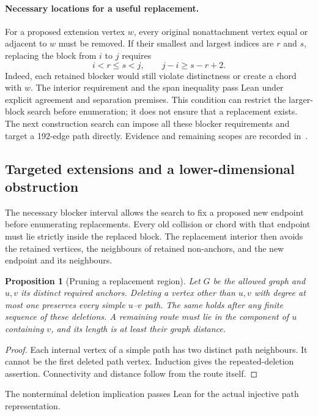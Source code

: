 \documentclass[11pt,a4paper]{article}
\newtheorem{proposition}[theorem]{Proposition}
\theoremstyle{definition}
\theoremstyle{remark}
\begin{document}
\paragraph{Necessary locations for a useful replacement.}
For a proposed extension vertex $w$, every original nonattachment
vertex equal or adjacent to $w$ must be removed. If their smallest
and largest indices are $r$ and $s$, replacing the block from $i$ to
$j$ requires
\[
i<r\le s<j,\qquad j-i\ge s-r+2.
\]
Indeed, each retained blocker would still violate distinctness or
create a chord with $w$. The interior requirement and the span
inequality pass Lean under explicit agreement and separation premises.
This condition can restrict the larger-block search before enumeration;
it does not ensure that a replacement exists. The next construction
search can impose all these blocker requirements and target a
192-edge path directly. Evidence and remaining scopes are recorded
in~\cite{block193archive}.


\subsection{Targeted extensions and a lower-dimensional obstruction}
\label{sec:target194}
The necessary blocker interval allows the search to fix a proposed new
endpoint before enumerating replacements. Every old collision or chord
with that endpoint must lie strictly inside the replaced block. The
replacement interior then avoids the retained vertices, the neighbours
of retained non-anchors, and the new endpoint and its neighbours.

\begin{proposition}[Pruning a replacement region]
Let $G$ be the allowed graph and $u,v$ its distinct required anchors.
Deleting a vertex other than $u,v$ with degree at most one preserves
every simple $u$--$v$ path. The same holds after any finite sequence
of these deletions. A remaining route must lie in the component of
$u$ containing $v$, and its length is at least their graph distance.
\end{proposition}
\begin{proof}
Each internal vertex of a simple path has two distinct path neighbours.
It cannot be the first deleted path vertex. Induction gives the
repeated-deletion assertion. Connectivity and distance follow from
the route itself.
\end{proof}
The nonterminal deletion implication passes Lean for the actual
injective path representation.
\end{document}
